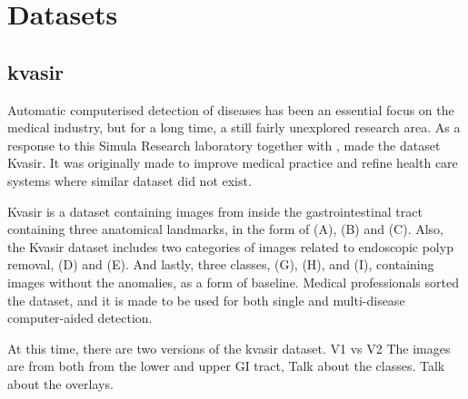\section{Datasets}
    
    \subsection{kvasir}


    Automatic computerised detection of diseases has been an essential focus on the medical industry, but for a long time, a still fairly unexplored research area.  As a response to this Simula Research laboratory together with , made the dataset Kvasir.
    It was originally made to improve medical practice and refine health care systems where similar dataset did not exist.

    Kvasir is a dataset containing images from inside the gastrointestinal tract containing three anatomical landmarks, in the form of (A), (B) and (C). Also, the Kvasir dataset includes two categories of images related to endoscopic polyp removal, (D) and (E). And lastly, three classes, (G), (H), and (I), containing images without the anomalies, as a form of baseline. 
    Medical professionals sorted the dataset, and it is made to be used for both single and multi-disease computer-aided detection. 


    At this time, there are two versions of the kvasir dataset.  V1 vs V2
    The images are from both from the lower and upper GI tract, 
    Talk about the classes. 
    Talk about the overlays.  
    
    
    
